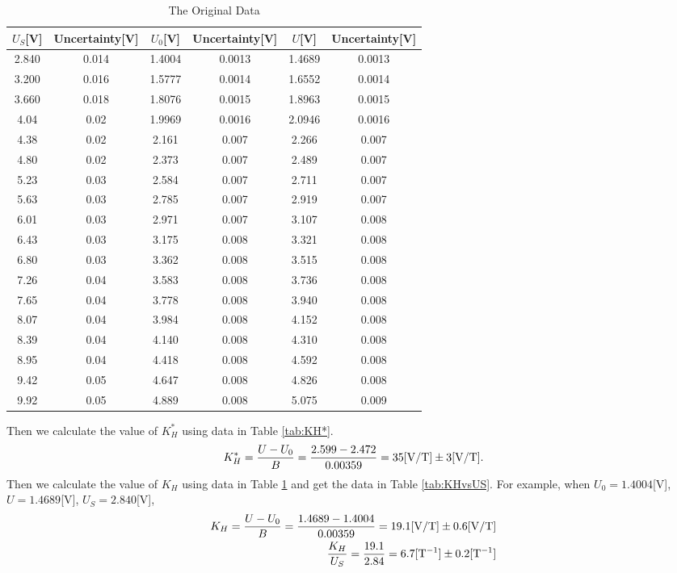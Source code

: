 \documentclass[a4paper]{article}
\begin{document}
    \begin{table}[H]
        \centering
        \begin{tabular}{|c|c|c|c|c|c|}
            \hline
            $U_S$[V]&Uncertainty[V]&$U_0$[V]&Uncertainty[V]&$U$[V]&Uncertainty[V]\\\hline
            2.840&0.014&1.4004&0.0013&1.4689&0.0013\\\hline
            3.200&0.016&1.5777&0.0014&1.6552&0.0014\\\hline
            3.660&0.018&1.8076&0.0015&1.8963&0.0015\\\hline
            4.04&0.02&1.9969&0.0016&2.0946&0.0016\\\hline
            4.38&0.02&2.161&0.007&2.266&0.007\\\hline
            4.80&0.02&2.373&0.007&2.489&0.007\\\hline
            5.23&0.03&2.584&0.007&2.711&0.007\\\hline
            5.63&0.03&2.785&0.007&2.919&0.007\\\hline
            6.01&0.03&2.971&0.007&3.107&0.008\\\hline
            6.43&0.03&3.175&0.008&3.321&0.008\\\hline
            6.80&0.03&3.362&0.008&3.515&0.008\\\hline
            7.26&0.04&3.583&0.008&3.736&0.008\\\hline
            7.65&0.04&3.778&0.008&3.940&0.008\\\hline
            8.07&0.04&3.984&0.008&4.152&0.008\\\hline
            8.39&0.04&4.140&0.008&4.310&0.008\\\hline
            8.95&0.04&4.418&0.008&4.592&0.008\\\hline
            9.42&0.05&4.647&0.008&4.826&0.008\\\hline
            9.92&0.05&4.889&0.008&5.075&0.009\\\hline
        \end{tabular}
        \caption{The Original Data}
        \label{tab:origin1}
    \end{table}
    Then we calculate the value of $K_H^*$ using data in Table \ref{tab:KH*}. $$K_H^*=\frac{U-U_0}{B}=\frac{2.599-2.472}{0.00359}=35[\rm V/T]\pm 3[V/T].$$
    Then we calculate the value of $K_H$ using data in Table \ref{tab:origin1} and get the data in Table \ref{tab:KHvsUS}. For example, when $U_0=1.4004$[V], $U=1.4689$[V], $U_S=2.840$[V], 
    \begin{eqnarray*}
        K_H=\frac{U-U_0}{B}=\frac{1.4689-1.4004}{0.00359}=19.1[{\rm V/T}]\pm 0.6[{\rm V/T}]\\
        \frac{K_H}{U_S}=\frac{19.1}{2.84}=6.7[{\rm T}^{-1}]\pm 0.2[{\rm T}^{-1}]
    \end{eqnarray*}
\end{document}
